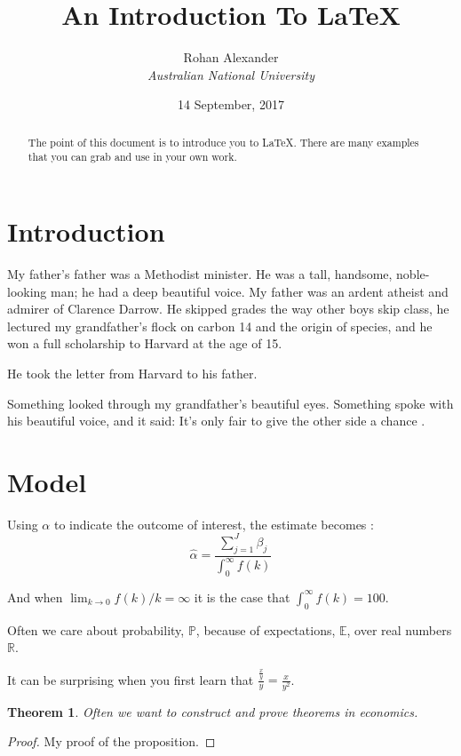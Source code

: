 \documentclass[a4paper, 12pt]{article}
\newtheorem{theorem}{Theorem}
\begin{document}
\title{An Introduction To \LaTeX}
\author{Rohan Alexander\\
\textit{Australian National University}}
\date{14 September, 2017}
\maketitle


\begin{abstract}
The point of this document is to introduce you to \LaTeX. There are many examples that you can grab and use in your own work.
\end{abstract}


\section{Introduction}
My father's father was a Methodist minister. He was a tall, handsome, noble-looking man; he had a deep beautiful voice. My father was an ardent atheist and admirer of Clarence Darrow. He skipped grades the way other boys skip class, he lectured my grandfather's flock on carbon 14 and the origin of species, and he won a full scholarship to Harvard at the age of 15.

He took the letter from Harvard to his father.

Something looked through my grandfather's beautiful eyes. Something spoke with his beautiful voice, and it said: It's only fair to give the other side a chance \cite{DeWitt2000}. 


\section{Model}
Using $\alpha$ to indicate the outcome of interest, the estimate becomes :
$$ \hat{\alpha} = \frac{\sum^J_{j=1}\beta_j}{\int^{\infty}_{0}f(k)} $$

And when $\lim_{k\rightarrow0}f(k)/k = \infty$ it is the case that $\int^{\infty}_{0}f(k) = 100$.

Often we care about probability, $\mathbb{P}$, because of expectations, $\mathbb{E}$, over real numbers $\mathbb{R}$.

It can be surprising when you first learn that $\frac{\frac{x}{y}}{y} = \frac{x}{y^2}$.

\begin{theorem}
Often we want to construct and prove theorems in economics.
\end{theorem}
\begin{proof}
My proof of the proposition.
\end{proof}
\end{document}
